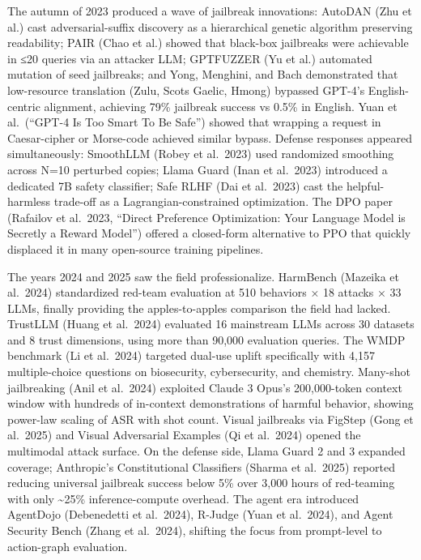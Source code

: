 The autumn of 2023 produced a wave of jailbreak innovations: AutoDAN (Zhu et al.) cast adversarial-suffix discovery as a hierarchical genetic algorithm preserving readability; PAIR (Chao et al.) showed that black-box jailbreaks were achievable in ≤20 queries via an attacker LLM; GPTFUZZER (Yu et al.) automated mutation of seed jailbreaks; and Yong, Menghini, and Bach demonstrated that low-resource translation (Zulu, Scots Gaelic, Hmong) bypassed GPT-4's English-centric alignment, achieving 79\% jailbreak success vs 0.5\% in English. Yuan et al.~(``GPT-4 Is Too Smart To Be Safe'') showed that wrapping a request in Caesar-cipher or Morse-code achieved similar bypass. Defense responses appeared simultaneously: SmoothLLM (Robey et al.~2023) used randomized smoothing across N=10 perturbed copies; Llama Guard (Inan et al.~2023) introduced a dedicated 7B safety classifier; Safe RLHF (Dai et al.~2023) cast the helpful-harmless trade-off as a Lagrangian-constrained optimization. The DPO paper (Rafailov et al.~2023, ``Direct Preference Optimization: Your Language Model is Secretly a Reward Model'') offered a closed-form alternative to PPO that quickly displaced it in many open-source training pipelines.

The years 2024 and 2025 saw the field professionalize. HarmBench (Mazeika et al.~2024) standardized red-team evaluation at 510 behaviors × 18 attacks × 33 LLMs, finally providing the apples-to-apples comparison the field had lacked. TrustLLM (Huang et al.~2024) evaluated 16 mainstream LLMs across 30 datasets and 8 trust dimensions, using more than 90,000 evaluation queries. The WMDP benchmark (Li et al.~2024) targeted dual-use uplift specifically with 4,157 multiple-choice questions on biosecurity, cybersecurity, and chemistry. Many-shot jailbreaking (Anil et al.~2024) exploited Claude 3 Opus's 200,000-token context window with hundreds of in-context demonstrations of harmful behavior, showing power-law scaling of ASR with shot count. Visual jailbreaks via FigStep (Gong et al.~2025) and Visual Adversarial Examples (Qi et al.~2024) opened the multimodal attack surface. On the defense side, Llama Guard 2 and 3 expanded coverage; Anthropic's Constitutional Classifiers (Sharma et al.~2025) reported reducing universal jailbreak success below 5\% over 3,000 hours of red-teaming with only \textasciitilde25\% inference-compute overhead. The agent era introduced AgentDojo (Debenedetti et al.~2024), R-Judge (Yuan et al.~2024), and Agent Security Bench (Zhang et al.~2024), shifting the focus from prompt-level to action-graph evaluation.

